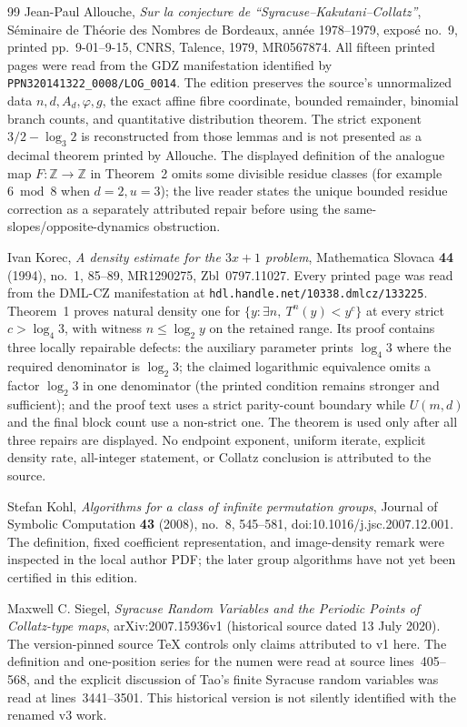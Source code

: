\begin{thebibliography}{99}
Jean-Paul Allouche,
\emph{Sur la conjecture de ``Syracuse--Kakutani--Collatz''},
S\'eminaire de Th\'eorie des Nombres de Bordeaux, ann\'ee 1978--1979,
expos\'e no.~9, printed pp.~9-01--9-15, CNRS, Talence, 1979,
MR0567874.  All fifteen printed pages were read from the GDZ manifestation
identified by \texttt{PPN320141322\_0008/LOG\_0014}.  The edition preserves
the source's unnormalized data \(n,d,A_d,\varphi,g\), the exact affine fibre
coordinate, bounded remainder, binomial branch counts, and quantitative
distribution theorem.  The strict exponent
\(3/2-\log_3 2\) is reconstructed from those lemmas and is not presented as
a decimal theorem printed by Allouche.  The displayed definition of the
analogue map \(F:\mathbb Z\to\mathbb Z\) in Theorem~2 omits some divisible
residue classes (for example \(6\bmod8\) when \(d=2,u=3\)); the live reader
states the unique bounded residue correction as a separately attributed
repair before using the same-slopes/opposite-dynamics obstruction.

Ivan Korec,
\emph{A density estimate for the $3x+1$ problem},
Mathematica Slovaca \textbf{44} (1994), no.~1, 85--89,
MR1290275, Zbl~0797.11027.  Every printed page was read from the DML-CZ
manifestation at \texttt{hdl.handle.net/10338.dmlcz/133225}.  Theorem~1 proves
natural density one for
\(\{y:\exists n,\ T^n(y)<y^c\}\) at every strict
\(c>\log_4 3\), with witness \(n\leq\log_2 y\) on the retained range.  Its
proof contains three locally repairable defects: the auxiliary parameter
prints \(\log_4 3\) where the required denominator is \(\log_2 3\); the
claimed logarithmic equivalence omits a factor \(\log_2 3\) in one
denominator (the printed condition remains stronger and sufficient); and the
proof text uses a strict parity-count boundary while \(U(m,d)\) and the final
block count use a non-strict one.  The theorem is used only after all three
repairs are displayed.  No endpoint exponent, uniform iterate, explicit
density rate, all-integer statement, or Collatz conclusion is attributed to
the source.

Stefan Kohl,
\emph{Algorithms for a class of infinite permutation groups},
Journal of Symbolic Computation \textbf{43} (2008), no.~8, 545--581,
doi:10.1016/j.jsc.2007.12.001.  The definition, fixed coefficient
representation, and image-density remark were inspected in the local author
PDF; the later group algorithms have not yet been certified in this edition.

Maxwell C. Siegel,
\emph{Syracuse Random Variables and the Periodic Points of Collatz-type
maps}, arXiv:2007.15936v1 (historical source dated 13 July 2020).  The
version-pinned source TeX controls only claims attributed to v1 here.  The
definition and one-position series for the numen were read at source
lines~405--568, and the explicit discussion of Tao's finite Syracuse random
variables was read at lines~3441--3501.  This historical version is not
silently identified with the renamed v3 work.


\end{thebibliography}
